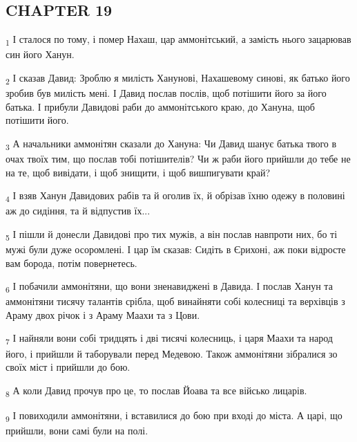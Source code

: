\subsection{CHAPTER 19}
\begin{tcolorbox}
\textsubscript{1} І сталося по тому, і помер Нахаш, цар аммонітський, а замість нього зацарював син його Ханун.
\end{tcolorbox}
\begin{tcolorbox}
\textsubscript{2} І сказав Давид: Зроблю я милість Ханунові, Нахашевому синові, як батько його зробив був милість мені. І Давид послав послів, щоб потішити його за його батька. І прибули Давидові раби до аммонітського краю, до Хануна, щоб потішити його.
\end{tcolorbox}
\begin{tcolorbox}
\textsubscript{3} А начальники аммонітян сказали до Хануна: Чи Давид шанує батька твого в очах твоїх тим, що послав тобі потішителів? Чи ж раби його прийшли до тебе не на те, щоб вивідати, і щоб знищити, і щоб вишпигувати край?
\end{tcolorbox}
\begin{tcolorbox}
\textsubscript{4} І взяв Ханун Давидових рабів та й оголив їх, й обрізав їхню одежу в половині аж до сидіння, та й відпустив їх...
\end{tcolorbox}
\begin{tcolorbox}
\textsubscript{5} І пішли й донесли Давидові про тих мужів, а він послав навпроти них, бо ті мужі були дуже осоромлені. І цар їм сказав: Сидіть в Єрихоні, аж поки відросте вам борода, потім повернетесь.
\end{tcolorbox}
\begin{tcolorbox}
\textsubscript{6} І побачили аммонітяни, що вони зненавиджені в Давида. І послав Ханун та аммонітяни тисячу талантів срібла, щоб винайняти собі колесниці та верхівців з Араму двох річок і з Араму Маахи та з Цови.
\end{tcolorbox}
\begin{tcolorbox}
\textsubscript{7} І найняли вони собі тридцять і дві тисячі колесниць, і царя Маахи та народ його, і прийшли й таборували перед Медевою. Також аммонітяни зібралися зо своїх міст і прийшли до бою.
\end{tcolorbox}
\begin{tcolorbox}
\textsubscript{8} А коли Давид прочув про це, то послав Йоава та все військо лицарів.
\end{tcolorbox}
\begin{tcolorbox}
\textsubscript{9} І повиходили аммонітяни, і вставилися до бою при вході до міста. А царі, що прийшли, вони самі були на полі.
\end{tcolorbox}
